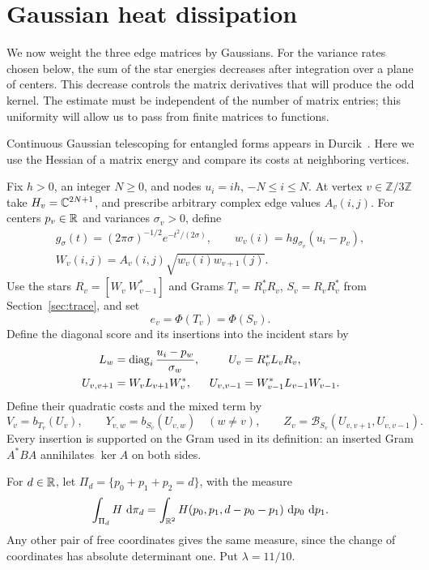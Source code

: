 \section{Gaussian heat dissipation}\label{sec:heat}
We now weight the three edge matrices by Gaussians.  For the variance rates
chosen below, the sum of the star energies decreases after integration over
a plane of centers.  This decrease controls the matrix derivatives that will
produce the odd kernel.  The estimate must be
independent of the number of matrix entries; this uniformity will allow us
to pass from finite matrices to functions.

Continuous Gaussian telescoping for entangled forms appears in
Durcik~\cite[Lemma~3 and Section~3]{Durcik2015}. Here we use the Hessian of a matrix
energy and compare its costs at neighboring vertices.

Fix $h>0$, an integer $N\ge0$, and nodes $u_i=ih$, $-N\le i\le N$.
At vertex $v\in\mathbb Z/3\mathbb Z$ take $H_v=\mathbb C^{2N+1}$, and prescribe
arbitrary complex edge values $A_v(i,j)$.  For centers $p_v\in\mathbb R$ and
variances $\sigma_v>0$, define
\begin{gather*}
 g_\sigma(t)=(2\pi\sigma)^{-1/2}e^{-t^2/(2\sigma)},\qquad
 w_v(i)=h g_{\sigma_v}(u_i-p_v),\\
 W_v(i,j)=A_v(i,j)\sqrt{w_v(i)w_{v+1}(j)}.
\end{gather*}
Use the stars $R_v=[W_v\ W_{v-1}^*]$ and Grams
$T_v=R_v^*R_v$, $S_v=R_vR_v^*$ from Section~\ref{sec:trace}, and set
\[
 e_v=\Phi(T_v)=\Phi(S_v).
\]
Define the diagonal score and its insertions into the incident stars by
\begin{align*}
 L_w&=\operatorname{diag}_i\frac{u_i-p_w}{\sigma_w},
 &U_v&=R_v^*L_vR_v,\\
 U_{v,v+1}&=W_vL_{v+1}W_v^*,
 &U_{v,v-1}&=W_{v-1}^*L_{v-1}W_{v-1}.
\end{align*}
Define their quadratic costs and the mixed term by
\begin{equation}\label{eq:heat-costs}
 V_v=b_{T_v}(U_v),\qquad
 Y_{v,w}=b_{S_v}(U_{v,w})\quad(w\ne v),\qquad
 Z_v=\mathcal B_{S_v}(U_{v,v+1},U_{v,v-1}).
\end{equation}
Every insertion is supported on the Gram used in its definition: an
inserted Gram $A^*BA$ annihilates $\ker A$ on both sides.

For $d\in\mathbb R$, let $\Pi_d=\{p_0+p_1+p_2=d\}$, with the measure
\begin{equation}\label{eq:heat-plane-measure}
 \int_{\Pi_d}H\,\mathop{}\!\mathrm d\pi_d
 =\int_{\mathbb R^2}H(p_0,p_1,d-p_0-p_1)\,\mathop{}\!\mathrm d p_0\,\mathop{}\!\mathrm d p_1.
\end{equation}
Any other pair of free coordinates gives the same measure, since the
change of coordinates has absolute determinant one.  Put $\lambda=11/10$.

